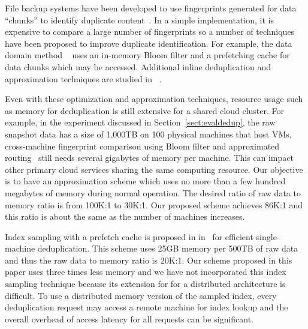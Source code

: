 File backup systems have been developed to use fingerprints generated for
data ``chunks''  to identify duplicate
content~\cite{venti02,Rhea2008}.  In a simple implementation,
it is expensive to compare a large number of 
fingerprints
so a number of techniques have been proposed to improve duplicate identification. 
For example, the data domain method ~\cite{bottleneck08} 
uses  an in-memory Bloom filter and a prefetching cache for data chunks 
which may be accessed.  
Additional inline deduplication and  approximation techniques
are studied in ~\cite{extreme_binning09,sparseindex09,Srinivasan2012,WeiZhangIEEE}.  

Even with these optimization and approximation techniques, resource usage such as memory  for deduplication
is still extensive for a shared cloud cluster.  
For example, in the experiment discussed in Section~\ref{sect:evaldedup}, 
the raw snapshot data has a size of 1,000TB on 100 physical machines that host VMs,
cross-machine fingerprint comparison using Bloom filter and approximated routing~\cite{bottleneck08,Dong2011} 
still needs several gigabytes of memory per machine. This can impact other primary cloud services sharing the same
computing resource. Our objective is to have an approximation scheme 
which uses no more than a few hundred megabytes of memory during normal operation.
The desired ratio of raw data to memory ratio is from 100K:1 to 30K:1.
Our proposed scheme achieves 86K:1
and this ratio is about the same as the number of machines increases.

Index sampling with a prefetch cache  is proposed in
in~\cite{Guo2011} for efficient single-machine deduplication. 
This scheme uses 25GB memory per 500TB of raw data
and thus the raw data to memory ratio is 20K:1. Our scheme proposed in this paper 
uses three times less memory and we have not incorporated this index 
sampling technique because its extension for
for a distributed architecture is difficult.  To use a distributed memory version 
of the sampled index, every deduplication
request may access a remote machine for index lookup and the overall overhead 
of access latency for all requests can be significant.

